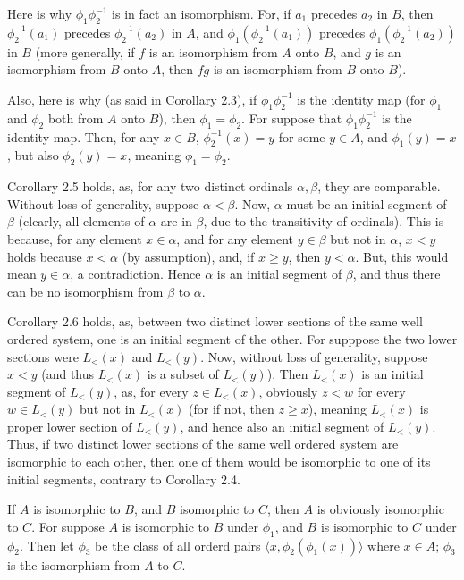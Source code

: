 \documentclass{article}
\theoremstyle{definition}
\begin{document}
Here is why $\phi_1\phi_2^{-1}$ is in fact an isomorphism. For, if $a_1$ precedes $a_2$ in $B$, then $\phi_2^{-1}(a_1)$ precedes 
$\phi_2^{-1}(a_2)$ in $A$, and $\phi_1(\phi_2^{-1}(a_1))$ precedes $\phi_1(\phi_2^{-1}(a_2))$ in $B$ (more generally, if 
$f$ is an isomorphism from $A$ onto $B$, and $g$ is an isomorphism from $B$ onto $A$, then $fg$ is an isomorphism from $B$ onto $B$).

Also, here is why (as said in Corollary 2.3), if $\phi_1\phi_2^{-1}$ is the identity map (for $\phi_1$ and $\phi_2$ both from $A$ onto $B$), 
then $\phi_1=\phi_2$. For suppose that $\phi_1\phi_2^{-1}$ is the identity map. Then, for any $x\in B$, 
$\phi_2^{-1}(x)=y$ for some $y\in A$, and $\phi_1(y)=x$, but also $\phi_2(y)=x$, meaning $\phi_1=\phi_2$. 

Corollary 2.5 holds, as, for any two distinct ordinals $\alpha,\beta$, they are comparable. Without loss of generality, suppose $\alpha<\beta$.
Now, $\alpha$ must be an initial segment of $\beta$ (clearly, all elements of $\alpha$ are in $\beta$, due to the transitivity of ordinals). This is 
because, for any element $x\in\alpha$, and for any element $y\in\beta$ but not in $\alpha$, $x<y$ holds because $x<\alpha$ (by assumption), and, if 
$x\ge y$, then $y<\alpha$. But, this would mean $y\in\alpha$, a contradiction. Hence $\alpha$ is an initial segment of $\beta$, and thus there 
can be no isomorphism from $\beta$ to $\alpha$. 

Corollary 2.6 holds, as, between two distinct lower sections of the same well ordered system, one is an initial segment of the other. For supppose
the two lower sections were $L_<(x)$ and $L_<(y)$. Now, without loss of generality, suppose $x<y$ (and thus $L_<(x)$ is a subset of $L_<(y)$). 
Then $L_<(x)$ is an initial segment of $L_<(y)$, 
as, for every $z\in L_<(x)$, obviously $z<w$ for every $w\in L_<(y)$ but not in $L_<(x)$ (for if not, then $z\ge x$), meaning $L_<(x)$ is proper lower 
section of $L_<(y)$, and hence also an initial segment of $L_<(y)$. Thus, if two distinct lower sections of the same well ordered system are isomorphic 
to each other, then one of them would be isomorphic to one of its initial segments, contrary to Corollary 2.4.

If $A$ is isomorphic to $B$, and $B$ isomorphic to $C$, then $A$ is obviously isomorphic to $C$. For suppose $A$ is isomorphic to $B$ under $\phi_1$, 
and $B$ is isomorphic to $C$ under $\phi_2$. Then let $\phi_3$ be the class of all orderd pairs $\langle x,\phi_2(\phi_1(x))\rangle$ where $x\in A$; 
$\phi_3$ is the isomorphism from $A$ to $C$.
\end{document}
